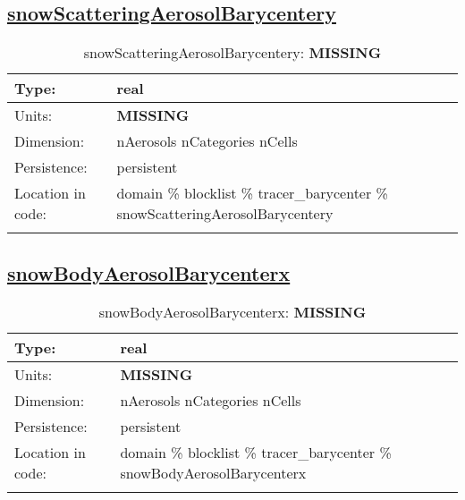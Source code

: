 \subsection[snowScatteringAerosolBarycentery]{\hyperref[sec:var_tab_tracer_barycenter]{snowScatteringAerosolBarycentery}}
\label{subsec:var_sec_tracer_barycenter_snowScatteringAerosolBarycentery}
\begin{center}
\begin{longtable}{| p{2.0in} | p{4.0in} |}
        \hline 
        Type: & real \\
        \hline 
        Units: & {\bf \color{red} MISSING} \\
        \hline 
        Dimension: & nAerosols nCategories nCells \\
        \hline 
        Persistence: & persistent \\
        \hline 
         Location in code: & domain \% blocklist \% tracer\_barycenter \% snowScatteringAerosolBarycentery \\
         \hline 
    \caption{snowScatteringAerosolBarycentery: {\bf \color{red} MISSING}}
\end{longtable}
\end{center}
\subsection[snowBodyAerosolBarycenterx]{\hyperref[sec:var_tab_tracer_barycenter]{snowBodyAerosolBarycenterx}}
\label{subsec:var_sec_tracer_barycenter_snowBodyAerosolBarycenterx}
\begin{center}
\begin{longtable}{| p{2.0in} | p{4.0in} |}
        \hline 
        Type: & real \\
        \hline 
        Units: & {\bf \color{red} MISSING} \\
        \hline 
        Dimension: & nAerosols nCategories nCells \\
        \hline 
        Persistence: & persistent \\
        \hline 
         Location in code: & domain \% blocklist \% tracer\_barycenter \% snowBodyAerosolBarycenterx \\
         \hline 
    \caption{snowBodyAerosolBarycenterx: {\bf \color{red} MISSING}}
\end{longtable}
\end{center}
